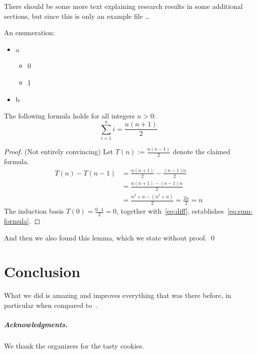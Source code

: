 \documentclass[a4paper,english,numberwithinsect]{eurocg20-submission}
\begin{document}
There should be some more text explaining 
research results in some additional sections, 
but since this is only an example file \dots

An enumeration:
\begin{itemize}
\item a
\begin{itemize}
  \item 0
  \item 1
\end{itemize}
\item b
\end{itemize}

\begin{lemma}
  The following formula holds
  for all integers $n>0$\textup:
\begin{equation}
  \label{eq:sum-formula}
  \sum_{i=1}^{n} i = \frac{n(n+1)}{2}
\end{equation}
\end{lemma}
\begin{proof} (Not entirely convincing)
Let \(T(n) := \frac{n(n-1)}{2}\) denote the claimed formula.
\begin{align}
  T(n) - T(n-1) &= \frac{n(n+1)}{2} - \frac{(n-1)n}{2}
\nonumber
  \\
                &= \frac{n(n+1) - (n-1)n}{2}
\nonumber
  \\
                &= \frac{n^2+n - (n^2+n)}{2} = \frac {2n}{2} = n
\label{eq:diff}                  
\end{align}
The induction basis $T(0)=\frac{0\cdot 1}2 = 0$, together with~\eqref{eq:diff},
establishes~\eqref{eq:sum-formula}.
\end{proof}

\begin{lemma}
  And then we also found this lemma, which we state without proof.
  \qed
\end{lemma}

\section{Conclusion}

What we did is amazing and improves everything that was there before,
in particular when compared to~\cite{g-atpwog-2006}.


\subparagraph*{Acknowledgments.} We thank the organizers for
the tasty cookies.


\end{document}
